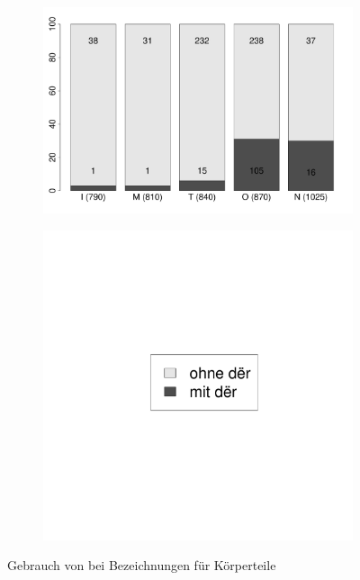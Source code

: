 \begin{figure}
\begin{subfigure}[b]{.6\linewidth}
  \includegraphics[width=10 cm]{generated/images/koerper}
\end{subfigure}%
\begin{subfigure}[b]{.1\linewidth}
  \includegraphics[height=.25\textheight]{generated/images/ort-legende}
\end{subfigure}

\caption{Gebrauch von  bei Bezeichnungen für Körperteile}
\label{fig:bel-koerper}
\end{figure}

